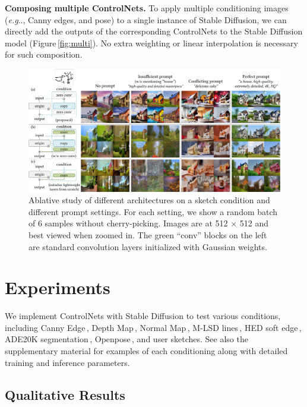 \documentclass[10pt,twocolumn,letterpaper]{article}
\makeatletter
\DeclareRobustCommand\onedot{\futurelet\@let@token\@onedot}
\def\@onedot{\ifx\@let@token.\else.\null\fi\xspace}
\def\eg{\emph{e.g}\onedot}
\def\para#1{\vspace{0.25em}\noindent\textbf{#1}}
\makeatother
\begin{document}
	\para{Composing multiple ControlNets.}
	To apply multiple conditioning images (\eg, Canny edges, and pose) to
	a single instance of Stable Diffusion, we can directly add the outputs
	of the corresponding ControlNets to the Stable Diffusion model (Figure\,\ref{fig:multi}). No
	extra weighting or linear interpolation is necessary for such composition.
	
	\begin{figure}[!t]
		\centering
		\vspace{-12pt}
		\includegraphics[width=\linewidth]{./imgs/ablat.pdf}
		\vspace{-18pt}
		\caption{Ablative study of different architectures on a sketch condition and different prompt settings. 
			For each setting, we show a random batch of 6 samples without cherry-picking. Images are at 512 $\times$ 512 and best viewed when zoomed in. The green ``conv'' blocks on the left are standard convolution layers initialized with Gaussian weights.
		}
		\vspace{-10pt}
		\label{fig:abla}
	\end{figure}
	
	\section{Experiments}
	\label{sec:exp}
	
	We implement ControlNets with Stable Diffusion to test various
	conditions, including Canny Edge\,\cite{canny1986computational}, Depth
	Map\,\cite{ranftl2020towards}, Normal Map\,\cite{diode_dataset}, M-LSD
	lines\,\cite{gu2021realtime}, HED soft
	edge\,\cite{xie2015holistically}, ADE20K
	segmentation\,\cite{zhou2017scene}, Openpose\,\cite{cao2019openpose},
	and user sketches. See also the supplementary material for 
	examples of each conditioning along with detailed training and inference parameters.
	
	\subsection{Qualitative Results}
	
\end{document}

